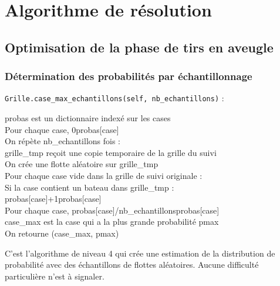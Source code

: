 \section{Algorithme de résolution}
\subsection{Optimisation de la phase de tirs en aveugle}
\subsubsection{Détermination des probabilités par échantillonnage}\label{case_max_echantillons}

\texttt{Grille.case\_max\_echantillons(self, nb\_echantillons)} :
\begin{algo1}
probas est un dictionnaire indexé sur les cases\\
Pour chaque case, 0\sto probas[case]\\
On répète nb\_echantillons fois :\\
grille\_tmp reçoit une copie temporaire de la grille du suivi\\
On crée une flotte aléatoire sur grille\_tmp\\
Pour chaque case vide dans la grille de suivi originale :\\
Si la case contient un bateau dans grille\_tmp :\\
probas[case]+1\sto probas[case]\\
Pour chaque case, probas[case]/nb\_echantillons\sto probas[case]\\
case\_max est la case qui a la plus grande probabilité pmax\\
On retourne (case\_max, pmax)\\
\end{algo1}

C'est l'algorithme de niveau 4 qui crée une estimation de la distribution de probabilité avec des échantillons de flottes aléatoires. Aucune difficulté particulière n'est à signaler.

\newpage
